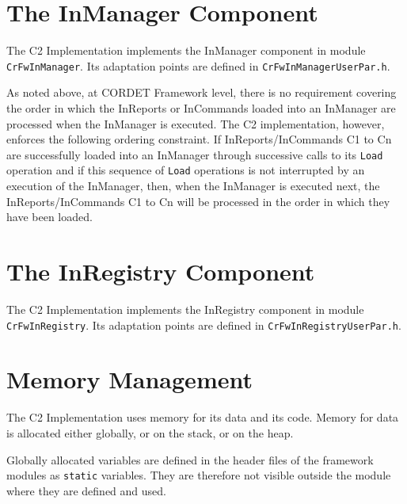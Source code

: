 \documentclass{pnp_article}
\begin{document}
\section{The InManager Component}\label{sec:InManager}


The C2 Implementation implements the InManager component in module \texttt{CrFwInManager}. Its adaptation points are defined in \texttt{CrFwInManagerUserPar.h}.

As noted above, at CORDET Framework level, there is no requirement covering the order in which the InReports or InCommands loaded into an InManager are processed when the InManager is executed. The C2 implementation, however, enforces the following ordering constraint. If InReports/InCommands C1 to Cn are successfully loaded into an InManager through successive calls to its \texttt{Load} operation and if this sequence of \texttt{Load} operations is not interrupted by an execution of the InManager, then, when the InManager is executed next, the InReports/InCommands C1 to Cn will be processed in the order in which they have been loaded.


\section{The InRegistry Component}\label{sec:InRegistry}


The C2 Implementation implements the InRegistry component in module \texttt{CrFwInRegistry}. Its adaptation points are defined in \texttt{CrFwInRegistryUserPar.h}.


\section{Memory Management}\label{sec:MemMng}

The C2 Implementation uses memory for its data and its code. Memory for data is allocated either globally, or on the stack, or on the heap.

Globally allocated variables are defined in the header files of the framework modules as \texttt{static} variables. They are therefore not visible outside the module where they are defined and used.
\end{document}
